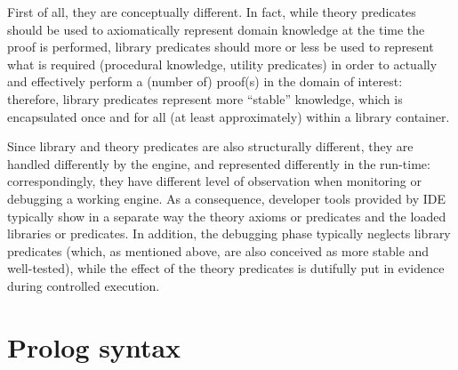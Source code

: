 First of all, they are conceptually different. In fact, while theory predicates should be used to axiomatically represent domain knowledge at the time the proof is performed, library predicates should more or less be used to represent what is required (procedural knowledge, utility predicates) in order to actually and effectively perform a (number of) proof(s) in the domain of interest: therefore, library predicates represent more ``stable'' knowledge, which is encapsulated once and for all (at least approximately) within a library container.

Since library and theory predicates are also structurally different, they are handled differently by the engine, and represented differently in the run-time: correspondingly, they have different level of observation when monitoring or debugging a working \tuprolog{} engine.
%
As a consequence, developer tools provided by \tuprolog{} IDE typically show in a separate way the theory axioms or predicates and the loaded libraries or predicates.
%
In addition, the debugging phase typically neglects library predicates (which, as mentioned above, are also conceived as more stable and well-tested), while the effect of the theory predicates is dutifully put in evidence during controlled execution.

\section{Prolog syntax}

